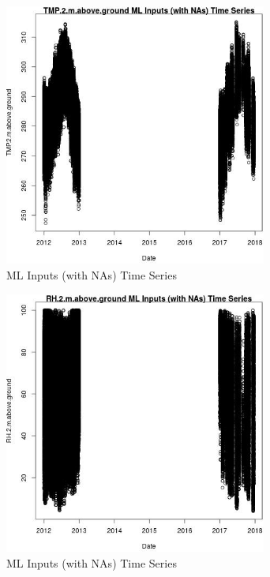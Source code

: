 \begin{figure} 
\centering  
\includegraphics[width=0.77\textwidth]{Code_Outputs/Report_ML_input_PM25_Step4_part_e_de_duplicated_aves_compiled_2019-05-14wNAs_TMP2mabovegroundvDate.jpg} 
\caption{\label{fig:Report_ML_input_PM25_Step4_part_e_de_duplicated_aves_compiled_2019-05-14wNAsTMP2mabovegroundvDate}ML Inputs (with NAs) Time Series} 
\end{figure} 
 

\begin{figure} 
\centering  
\includegraphics[width=0.77\textwidth]{Code_Outputs/Report_ML_input_PM25_Step4_part_e_de_duplicated_aves_compiled_2019-05-14wNAs_RH2mabovegroundvDate.jpg} 
\caption{\label{fig:Report_ML_input_PM25_Step4_part_e_de_duplicated_aves_compiled_2019-05-14wNAsRH2mabovegroundvDate}ML Inputs (with NAs) Time Series} 
\end{figure} 
 

